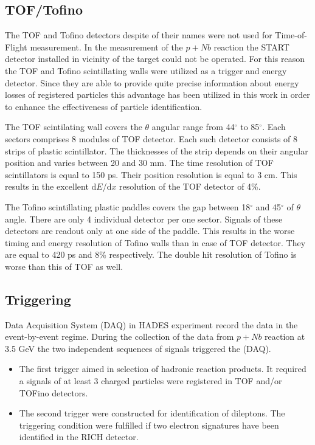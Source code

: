 \subsection{TOF/Tofino}

The TOF and Tofino detectors despite of their names were not used for Time-of-Flight measurement.
In the measurement of the $p+Nb$ reaction the START detector installed in vicinity of the target could not be operated.
For this reason the TOF and Tofino scintillating walls were utilized as a trigger and energy detector. 
Since they are able to provide quite precise information about energy losses of registered particles  
this advantage has been utilized in this work in order to enhance the effectiveness of particle identification.  

The TOF scintilating wall covers the $\theta$ angular range from 44$^{\circ}$ to 85$^{\circ}$. 
Each sectors comprises 8 modules of TOF detector. Each such detector consists of 8 strips of plastic scintillator. 
The thicknesses of the strip depends on their angular position and varies between 20 and 30 mm.
The time resolution of TOF scintillators is equal to 150 ps. Their position resolution is equal to 3 cm.
This results in the excellent d$E$/d$x$ resolution of the TOF detector of 4\%.  

The Tofino scintillating plastic paddles covers the gap between 18$^{\circ}$ and 45$^{\circ}$ of $\theta$ angle.
There are only 4 individual detector per one sector. 
Signals of these detectors are readout only at one side of the paddle. This results 
in the worse timing and energy resolution of Tofino walls than in case of TOF detector. 
They are equal to 420 ps and 8\% respectively.
The double hit resolution of Tofino is worse than this of TOF as well.


\subsection{Triggering}

Data Acquisition System (DAQ) in HADES experiment record the data in the event-by-event regime. 
During the collection of the data from $p+Nb$ reaction at 3.5 GeV the two independent sequences of signals triggered the (DAQ).

\begin{itemize}
\item The first trigger aimed in selection of hadronic reaction products. It required a signals of at least 3 charged particles were registered 
in TOF and/or TOFino detectors.  
\item The second trigger were constructed for identification of dileptons. The triggering condition were fulfilled if two electron signatures have been
identified in the RICH detector.
\end{itemize}

